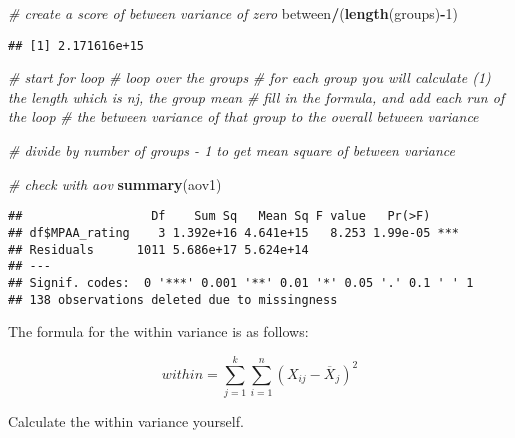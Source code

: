 \documentclass[
]{article}
\newenvironment{Shaded}{\begin{snugshade}}{\end{snugshade}}
\newcommand{\CommentTok}[1]{\textcolor[rgb]{0.56,0.35,0.01}{\textit{#1}}}
\newcommand{\DecValTok}[1]{\textcolor[rgb]{0.00,0.00,0.81}{#1}}
\newcommand{\KeywordTok}[1]{\textcolor[rgb]{0.13,0.29,0.53}{\textbf{#1}}}
\newcommand{\NormalTok}[1]{#1}
\newcommand{\OperatorTok}[1]{\textcolor[rgb]{0.81,0.36,0.00}{\textbf{#1}}}
\begin{document}
\begin{Shaded}
\begin{Highlighting}[]
\CommentTok{# create a score of between variance of zero}
\NormalTok{between}\OperatorTok{/}\NormalTok{(}\KeywordTok{length}\NormalTok{(groups)}\OperatorTok{-}\DecValTok{1}\NormalTok{)}
\end{Highlighting}
\end{Shaded}

\begin{verbatim}
## [1] 2.171616e+15
\end{verbatim}

\begin{Shaded}
\begin{Highlighting}[]
\CommentTok{# start for loop}
\CommentTok{# loop over the groups}
\CommentTok{# for each group you will calculate (1) the length which is nj, the group mean}
\CommentTok{# fill in the formula, and add each run of the loop}
\CommentTok{# the between variance of that group to the overall between variance}

\CommentTok{# divide by number of groups - 1 to get mean square of between variance}

\CommentTok{# check with aov}
\KeywordTok{summary}\NormalTok{(aov1)}
\end{Highlighting}
\end{Shaded}

\begin{verbatim}
##                  Df    Sum Sq   Mean Sq F value   Pr(>F)    
## df$MPAA_rating    3 1.392e+16 4.641e+15   8.253 1.99e-05 ***
## Residuals      1011 5.686e+17 5.624e+14                     
## ---
## Signif. codes:  0 '***' 0.001 '**' 0.01 '*' 0.05 '.' 0.1 ' ' 1
## 138 observations deleted due to missingness
\end{verbatim}

The formula for the within variance is as follows:

\[within=\sum_{j=1}^k \sum_{i=1}^n\left(X_{ij}-\overline{X}_{j}\right)^2\]

Calculate the within variance yourself.
\end{document}

